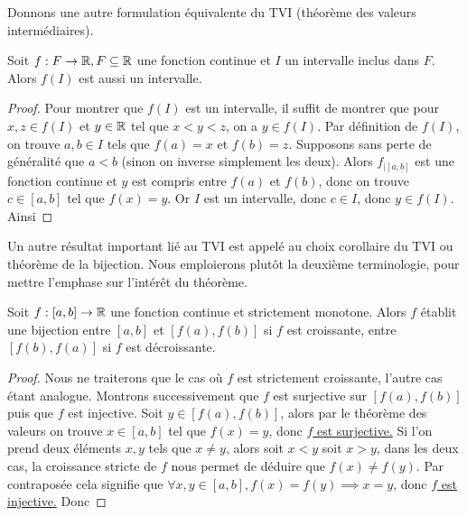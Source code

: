 Donnons une autre formulation équivalente du TVI (théorème des valeurs intermédiaires).

\begin{prop}
    Soit $f : F\to\mathbb{R},F\subseteq\mathbb{R}$ une fonction continue et $I$ un intervalle inclus dans $F$. Alors $f(I)$ est aussi un intervalle.
\end{prop}

\begin{proof}
    Pour montrer que $f(I)$ est un intervalle, il suffit de montrer que pour $x,z\in f(I)$ et $y\in\mathbb{R}$ tel que $x < y < z$, on a $y\in f(I)$. Par définition de $f(I)$, on trouve $a,b\in I$ tels que $f(a)=x$ et $f(b) = z$. Supposons sans perte de généralité que $a < b$ (sinon on inverse simplement les deux). Alors $f_{|[a,b]}$ est une fonction continue et $y$ est compris entre $f(a)$ et $f(b)$, donc on trouve $c\in [a,b]$ tel que $f(x) = y$. Or $I$ est un intervalle, donc $c\in I$, donc $y\in f(I)$. Ainsi 
\end{proof}

Un autre résultat important lié au TVI est appelé au choix \og corollaire du TVI\fg{} ou \og théorème de la bijection\fg{}. Nous emploierons plutôt la deuxième terminologie, pour mettre l'emphase sur l'intérêt du théorème.

\begin{them}[Bijection]
    Soit $f : [a,b] \to\mathbb{R}$ une fonction continue et strictement monotone. Alors $f$ établit une bijection entre $[a,b]$ et $[f(a),f(b)]$ si $f$ est croissante, entre $[f(b),f(a)]$ si $f$ est décroissante.
\end{them}

\begin{proof}
    Nous ne traiterons que le cas où $f$ est strictement croissante, l'autre cas étant analogue. Montrons successivement que $f$ est surjective sur $[f(a),f(b)]$ puis que $f$ est injective. Soit $y\in[f(a),f(b)]$, alors par le théorème des valeurs on trouve $x\in [a,b]$ tel que $f(x) = y$, donc \underline{$f$ est surjective.} Si l'on prend deux éléments $x,y$ tels que $x\neq y$, alors soit $x < y$ soit $x > y$, dans les deux cas, la croissance stricte de $f$ nous permet de déduire que $f(x)\neq f(y)$. Par contraposée cela signifie que $\forall x,y\in[a,b], f(x)=f(y)\implies x=y$, donc \underline{$f$ est injective.} Donc 
\end{proof}

